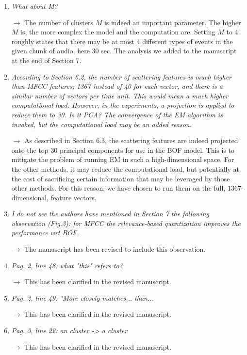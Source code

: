 \documentclass[10pt]{article}
\begin{document}
\begin{enumerate}
\item \emph{What about M?}

$\rightarrow$ The number of clusters $M$ is indeed an important parameter. The higher $M$ is, the more complex the model and the computation are. Setting $M$ to 4 roughly states that there may be at most 4 different types of events in the given chunk of audio, here 30 sec. The analysis we added to the manuscript at the end of Section 7.

\item \emph{According to Section 6.2, the number of scattering features is much higher than MFCC features; 1367 instead of 40 for each vector, and there is a similar number of vectors per time unit. This would mean a much higher computational load. However, in the experiments, a projection is applied to reduce them to 30. Is it PCA? The convergence of the EM  algorithm is invoked, but the computational load may be an added reason.}

$\rightarrow$
As described in Section 6.3, the scattering features are indeed projected onto the top $30$ principal components for use in the BOF model. This is to mitigate the problem of running EM in such a high-dimensional space. For the other methods, it may reduce the computational load, but potentially at the cost of sacrificing certain information that may be leveraged by those other methods. For this reason, we have chosen to run them on the full, $1367$-dimensional, feature vectors.

\item \emph{I do not see the authors have mentioned in Section 7 the following observation (Fig.3): for MFCC the relevance-based quantization improves the performance wrt BOF.}

$\rightarrow$
The manuscript has been revised to include this observation.

\item \emph{Pag. 2, line 48: what "this" refers to?}

$\rightarrow$
This has been clarified in the revised manuscript.

\item \emph{Pag. 2, line 49: "More closely matches... than...}

$\rightarrow$
This has been clarified in the revised manuscript.

\item \emph{Pag. 3, line 22: an cluster -\textgreater{} a cluster}

$\rightarrow$
This has been clarified in the revised manuscript.


\end{enumerate}
\end{document}
